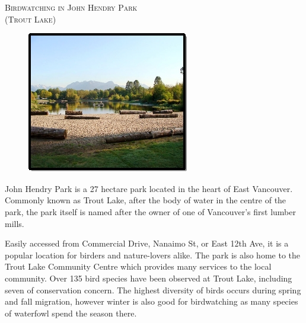 

\begin{center}
\textsc{\LARGE Birdwatching in John Hendry Park}\\[0.2cm]
\textsc{\Large (Trout Lake)}\\[0.2cm]
\end{center}

\begin{figure}[h]
  \centering
    \includegraphics{photos/tlcover}
\end{figure}

\large
John Hendry Park is a 27 hectare park located in the heart of East Vancouver. 
Commonly known as Trout Lake, after the body of water in the centre of the park, the 
park itself is named after the owner of one of Vancouver's first lumber mills. 

Easily accessed from Commercial Drive, Nanaimo St, or East 12th Ave, it is a popular location 
for birders and nature-lovers alike. The park is also home to the 
Trout Lake Community Centre which provides many services to the local community. 
Over 135 bird species have been observed at Trout Lake, including seven of conservation concern.
The highest diversity of birds occurs during spring and fall migration, however
winter is also good for birdwatching as many species of waterfowl spend the season there.

